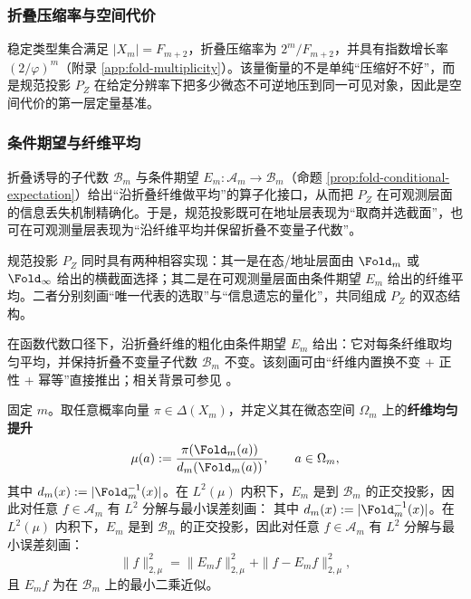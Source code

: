 \subsubsection{折叠压缩率与空间代价}\label{subsec:pom-fold-compression}
稳定类型集合满足 $|X_m|=F_{m+2}$，折叠压缩率为 $2^m/F_{m+2}$，并具有指数增长率 $(2/\varphi)^m$（附录 \ref{app:fold-multiplicity}）。该量衡量的不是单纯“压缩好不好”，而是规范投影 \(P_Z\) 在给定分辨率下把多少微态不可逆地压到同一可见对象，因此是空间代价的第一层定量基准。

\subsubsection{条件期望与纤维平均}\label{subsec:pom-conditional-expectation}
折叠诱导的子代数 $\mathcal{B}_m$ 与条件期望 $E_m:\mathcal{A}_m\to\mathcal{B}_m$（命题 \ref{prop:fold-conditional-expectation}）给出“沿折叠纤维做平均”的算子化接口，从而把 \(P_Z\) 在可观测层面的信息丢失机制精确化。于是，规范投影既可在地址层表现为“取商并选截面”，也可在可观测量层表现为“沿纤维平均并保留折叠不变量子代数”。

\begin{remark}[规范投影的双态]\label{rem:pom-pz-dual}
规范投影 $P_Z$ 同时具有两种相容实现：其一是在态/地址层面由 $\Fold_m$ 或 $\Fold_\infty$ 给出的横截面选择；其二是在可观测量层面由条件期望 $E_m$ 给出的纤维平均。二者分别刻画“唯一代表的选取”与“信息遗忘的量化”，共同组成 $P_Z$ 的双态结构。
\end{remark}

在函数代数口径下，沿折叠纤维的粗化由条件期望 $E_m$ 给出：它对每条纤维取均匀平均，并保持折叠不变量子代数 $\mathcal{B}_m$ 不变。该刻画可由“纤维内置换不变 + 正性 + 幂等”直接推出；相关背景可参见 \cite{WaltersErgodicTheory}。

固定 $m$。取任意概率向量 $\pi\in\Delta(X_m)$，并定义其在微态空间 $\Omega_m$ 上的\textbf{纤维均匀提升}
\begin{equation}
\label{eq:pom-fiber-uniform-lift}
\mu(a):=\frac{\pi(\Fold_m(a))}{d_m(\Fold_m(a))},\qquad a\in\Omega_m,
\end{equation}
其中 $d_m(x):=|\Fold_m^{-1}(x)|$。在 $L^2(\mu)$ 内积下，$E_m$ 是到 $\mathcal{B}_m$ 的正交投影，因此对任意 $f\in\mathcal{A}_m$ 有 $L^2$ 分解与最小误差刻画：
其中 $d_m(x):=|\Fold_m^{-1}(x)|$。在 $L^2(\mu)$ 内积下，$E_m$ 是到 $\mathcal{B}_m$ 的正交投影，因此对任意 $f\in\mathcal{A}_m$ 有 $L^2$ 分解与最小误差刻画：
\begin{equation}
\label{eq:pom-L2-pythagoras}
\|f\|_{2,\mu}^2=\|E_m f\|_{2,\mu}^2+\|f-E_m f\|_{2,\mu}^2,
\end{equation}
且 $E_m f$ 为在 $\mathcal{B}_m$ 上的最小二乘近似。

